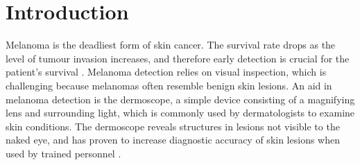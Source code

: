 \documentclass[a4paper,12pt]{article}
\begin{document}
\begin{abstract}
\end{abstract}

\newpage

\section{Introduction}

Melanoma is the deadliest form of skin cancer. The survival rate drops as the level of tumour invasion increases, and therefore early detection is crucial for the patient's survival \citep{AmericanCancerSociety2016Cancer, CancerRegistryofNorway2016Cancer}. Melanoma detection relies on visual inspection, which is challenging because melanomas often resemble benign skin lesions. 
An aid in melanoma detection is the dermoscope, a simple device consisting of a magnifying lens and surrounding light, which is commonly used by dermatologists to examine skin conditions. 
The dermoscope reveals structures in lesions not visible to the naked eye, and has proven to increase diagnostic accuracy of skin lesions when used by trained personnel \citep{Kittler2002Diagnostic}.
\end{document}
